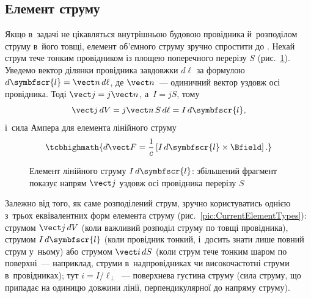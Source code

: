 \subsection*{Елемент струму}


Якщо в~задачі не цікавляться внутрішньою будовою провідника й~розподілом струму в~його
товщі, елемент об'ємного струму зручно спростити до .
Нехай струм тече тонким провідником із площею поперечного перерізу $S$
(рис.~\ref{pic:CurrentElement}). Уведемо вектор ділянки провідника завдовжки $d\ell$ за
формулою $d\symbfscr{l} = \vect n\, d\ell$, де $\vect n$~--- одиничний вектор уздовж осі
провідника. Тоді $\vect j = j\vect n$, а~$I = jS$, тому
\begin{equation}\label{eq:LinearCurrentElement}
	\vect j\, dV = j\vect n\, S\, d\ell = I\, d\symbfscr{l},
\end{equation}
і~сила Ампера для елемента лінійного струму
\begin{equation}\label{eq:AmpereForceLin}
	\tcbhighmath{
		d\vect F = \frac1c\left[I\, d\symbfscr{l}\times\Bfield\right].
	}
\end{equation}

\begin{figure}\centering
	\caption{Елемент лінійного струму $I\, d\symbfscr{l}$: збільшений фрагмент показує напрям
		$\vect j$ уздовж осі провідника перерізу $S$\label{pic:CurrentElement}}
\end{figure}

Залежно від того, як саме розподілений струм, зручно користуватись однією з~трьох
еквівалентних форм елемента струму (рис.~\ref{pic:CurrentElementTypes}): 
струмом $\vect j\, dV$ (коли важливий розподіл струму по товщі провідника),
 струмом $I\, d\symbfscr{l}$ (коли провідник тонкий, і~досить знати лише
повний струм у~ньому) або  струмом $\vect i\, dS$ (коли струм тече
тонким шаром по поверхні~--- наприклад, струми в~надпровідниках чи високочастотні струми
в~провідниках); тут $i = I/\ell_{\perp}$~--- поверхнева густина струму (сила струму, що
припадає на одиницю довжини лінії, перпендикулярної до напряму струму).

